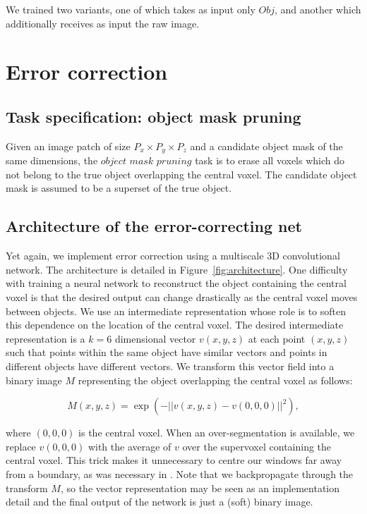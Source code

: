 \documentclass{article}
\begin{document}
We trained two variants, one of which takes as input only $Obj$, and another which additionally receives as input the raw image.

\section{Error correction}
\subsection{Task specification: object mask pruning}
Given an image patch of size $P_x\times P_y\times P_z$ and a candidate object mask of the same dimensions, the $\textit{object mask pruning}$ task is to erase all voxels which do not belong to the true object overlapping the central voxel.  The candidate object mask is assumed to be a superset of the true object.

\subsection{Architecture of the error-correcting net}
Yet again, we implement error correction using a multiscale 3D convolutional network. The architecture is detailed in Figure~\ref{fig:architecture}. One difficulty with training a neural network to reconstruct the object containing the central voxel is that the desired output can change drastically as the central voxel moves between objects. We use an intermediate representation whose role is to soften this dependence on the location of the central voxel. The desired intermediate representation is a $k=6$ dimensional vector $v(x,y,z)$ at each point $(x,y,z)$ such that points within the same object have similar vectors and points in different objects have different vectors. We transform this vector field into a binary image $M$ representing the object overlapping the central voxel as follows:

\begin{equation*}
	M(x,y,z)=\exp\left( -||v(x,y,z)-v(0,0,0)||^2 \right),
\end{equation*}

where $(0,0,0)$ is the central voxel. When an over-segmentation is available, we replace $v(0,0,0)$ with the average of $v$ over the supervoxel containing the central voxel. This trick makes it unnecessary to centre our windows far away from a boundary, as was necessary in \cite{floodfilling}. Note that we backpropagate through the transform $M$, so the vector representation may be seen as an implementation detail and the final output of the network is just a (soft) binary image.
\end{document}
